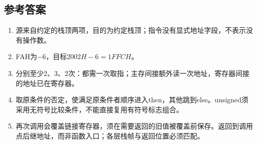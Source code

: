 \subsection{参考答案}\label{CO04-answers}

\begin{enumerate}
\def\labelenumi{\arabic{enumi}.}
\setcounter{enumi}{1}
\tightlist
\item
  源来自约定的栈顶两项，目的为约定栈顶；指令没有显式地址字段，不表示没有操作数。
\item
  FAH为\ensuremath{-}6，目标\(2002H-6=1FFCH\)。
\item
  分别至少2、3、2次：都需一次取指；主存间接额外读一次地址，寄存器间接的地址已在寄存器。
\item
  取原条件的否定，使满足原条件者顺序进入then，其他跳到else。unsigned须采用无符号比较条件，不能直接复用有符号标志组合。
\item
  再次调用会覆盖链接寄存器，须在需要返回的旧值被覆盖前保存。返回到调用点后继地址，而非函数入口；各层栈帧与返回位置必须匹配。
\end{enumerate}
